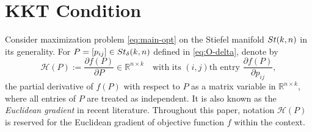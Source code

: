 \documentclass[11pt]{article}
\def\bbR{\mathbb{R}}
\def\scrH{\mathscr{H}}
\newcommand\STM[2]{{\rm St}(#1,#2)}
\newcommand\STMnbr{{\rm St}_{\delta}(k,n)}
\DeclareMathOperator{\sym}{sym}
\DeclareMathOperator{\tr}{tr}
\DeclareMathOperator{\T}{T}
\theoremstyle{definition}
\numberwithin{equation}{section}
\begin{document}





\section{KKT Condition}\label{sec:KKT}
Consider maximization problem \eqref{eq:main-opt} on the Stiefel manifold $\STM{k}{n}$ in its generality.
For $P=[p_{ij}]\in\STMnbr$ defined in \eqref{eq:O-delta}, denote by
\begin{equation}\label{eq:f-gradR(nk)}
\scrH(P):=\frac{\partial f(P)}{\partial P} \in\bbR^{n\times k}
\quad\mbox{with its $(i,j)$th entry}\,\,
\frac{\partial f(P)}{\partial p_{ij}},
\end{equation}
the partial derivative of $f(P)$ with respect to $P$ as a matrix variable in $\bbR^{n\times k}$, where
all entries of $P$ are treated as independent. It is also known as the {\em Euclidean gradient\/} in recent literature.
Throughout this paper, notation $\scrH(P)$ is reserved for the Euclidean gradient of objective function $f$ within the context.
\end{document}
